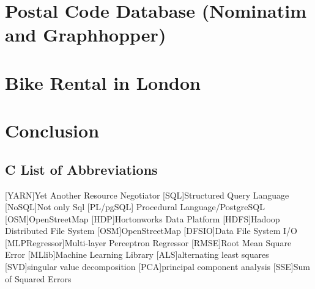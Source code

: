 \documentclass[12pt]{report}
\renewcommand{\listfigurename}{\begingroup
    \tocchapter{}
    \tocfile{\listoffigurename}{B Illustration Directory}
\endgroup}
\begin{document}
\chapter{Postal Code Database (Nominatim and Graphhopper)}





\chapter{Bike Rental in London}





\chapter{Conclusion}

% 

\newpage


\renewcommand{\listfigurename}{B Illustration Directory}
\listoffigures
\section*{C List of Abbreviations}
\begin{acronym}
    [YARN]{Yet Another Resource Negotiator}
     [SQL]{Structured Query Language}
     [NoSQL]{Not only Sql}
    [PL/pgSQL] {Procedural Language/PostgreSQL}
    [OSM]{OpenStreetMap}
    [HDP]{Hortonworks Data Platform}
     [HDFS]{Hadoop Distributed File System}
    [OSM]{OpenStreetMap}
    [DFSIO]{Data File System I/O}
    [MLPRegressor]{Multi-layer Perceptron Regressor}
    [RMSE]{Root Mean Square Error}
    [MLlib]{Machine Learning Library}
    [ALS]{alternating least squares}
    [SVD]{singular value decomposition}
    [PCA]{principal component analysis}
    [SSE]{Sum of Squared Errors}
\end{acronym}
\end{document}
